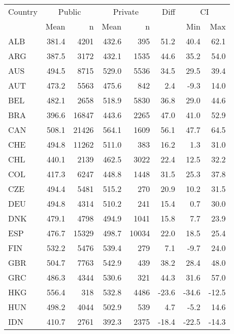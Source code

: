 \begin{table}[ht]
\begin{center}
{\smaller
\begin{tabular}{lrr@{\extracolsep{10pt}}rr@{\extracolsep{10pt}}rrr}
  \hline
  Country & \multicolumn{2}{c}{Public} & \multicolumn{2}{c}{Private} & Diff & \multicolumn{2}{c}{CI} \\ \cline{2-3} \cline{4-5} \cline{7-8} & Mean & n & Mean & n & & Min & Max \\ \hline
ALB & 381.4 & 4201 & 432.6 & 395 & 51.2 & 40.4 & 62.1 \\ 
  ARG & 387.5 & 3172 & 432.1 & 1535 & 44.6 & 35.2 & 54.0 \\ 
  AUS & 494.5 & 8715 & 529.0 & 5536 & 34.5 & 29.5 & 39.4 \\ 
  AUT & 473.2 & 5563 & 475.6 & 842 & 2.4 & -9.3 & 14.0 \\ 
  BEL & 482.1 & 2658 & 518.9 & 5830 & 36.8 & 29.0 & 44.6 \\ 
  BRA & 396.6 & 16847 & 443.6 & 2265 & 47.0 & 41.0 & 52.9 \\ 
  CAN & 508.1 & 21426 & 564.1 & 1609 & 56.1 & 47.7 & 64.5 \\ 
  CHE & 494.8 & 11262 & 511.0 & 383 & 16.2 & 1.3 & 31.0 \\ 
  CHL & 440.1 & 2139 & 462.5 & 3022 & 22.4 & 12.5 & 32.2 \\ 
  COL & 417.3 & 6247 & 448.8 & 1448 & 31.5 & 25.3 & 37.8 \\ 
  CZE & 494.4 & 5481 & 515.2 & 270 & 20.9 & 10.2 & 31.5 \\ 
  DEU & 494.8 & 4314 & 510.2 & 241 & 15.4 & 0.7 & 30.0 \\ 
  DNK & 479.1 & 4798 & 494.9 & 1041 & 15.8 & 7.7 & 23.9 \\ 
  ESP & 476.7 & 15329 & 498.7 & 10034 & 22.0 & 18.5 & 25.4 \\ 
  FIN & 532.2 & 5476 & 539.4 & 279 & 7.1 & -9.7 & 24.0 \\ 
  GBR & 504.7 & 7763 & 542.9 & 439 & 38.2 & 28.4 & 48.0 \\ 
  GRC & 486.3 & 4344 & 530.6 & 321 & 44.3 & 31.6 & 57.0 \\ 
  HKG & 556.4 & 318 & 532.8 & 4486 & -23.6 & -34.6 & -12.5 \\ 
  HUN & 498.2 & 4044 & 502.9 & 539 & 4.7 & -5.2 & 14.6 \\ 
  IDN & 410.7 & 2761 & 392.3 & 2375 & -18.4 & -22.5 & -14.3 \\ 

\end{tabular}}
\end{center}
\end{table}
